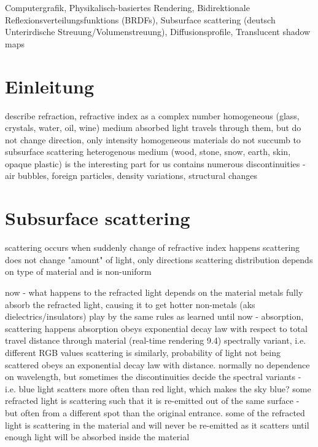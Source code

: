 \documentclass[ngerman,runningheads,a4paper]{llncs}[2018/03/10]
\begin{document}
\begin{keywords}
  Computergrafik, Physikalisch-basiertes Rendering, Bidirektionale Reflexionsverteilungsfunktions (BRDFs), Subsurface scattering (deutsch Unterirdische Streuung/Volumenstreuung), Diffusionsprofile, Translucent shadow maps
\end{keywords}

\section{Einleitung}
\label{sec:intro}

describe
refraction,
refractive index as a complex number
homogeneous (glass, crystals, water, oil, wine) medium
absorbed light travels through them, but do not change direction, only intensity
homogeneous materials do not succumb to subsurface scattering
heterogenous medium (wood, stone, snow, earth, skin, opaque plastic) is the interesting part for us
contains numerous discontinuities - air bubbles, foreign particles, density variations, structural changes


\section{Subsurface scattering}
\label{sec:subsurface}

 scattering occurs when suddenly change of refractive index happens
 scattering does not change "amount" of light, only directions
 scattering distribution depends on type of material and is non-uniform

 now - what happens to the refracted light
   depends on the material
     metals fully absorb the refracted light, causing it to get hotter
     non-metals (aks dielectrics/insulators) play by the same rules as learned until now - absorption, scattering happens
       absorption obeys exponential decay law with respect to total travel distance through material (real-time rendering 9.4)
         spectrally variant, i.e. different RGB values
       scattering is similarly, probability of light not being scattered obeys an exponential decay law with distance.
         normally no dependence on wavelength, but sometimes the discontinuities decide the spectral variants - i.e. blue light scatters more often than red light, which makes the sky blue?
   some refracted light is scattering such that it is re-emitted out of the same surface - but often from a different spot than the original entrance.
   some of the refracted light is scattering in the material and will never be re-emitted as it scatters until enough light will be absorbed inside the material
\end{document}
